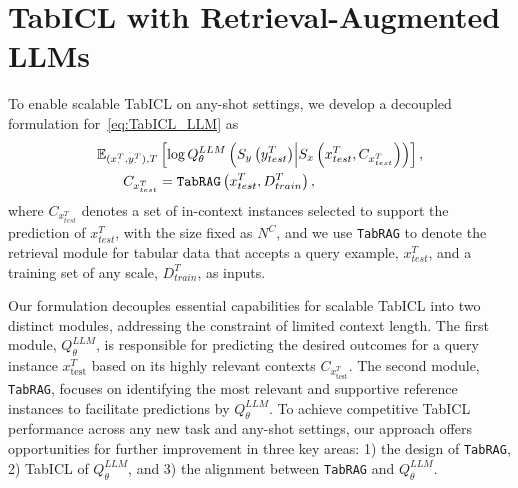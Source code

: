 
\section{TabICL with Retrieval-Augmented LLMs}
\label{sec:method}

To enable scalable TabICL on any-shot settings, we develop a decoupled formulation for~\eqref{eq:TabICL_LLM} as
\begin{align}
\begin{split}
    \mathbb{E}_{(x^T_{\cdot}, y^T_{\cdot}), T}
    &\left[ \log Q^{LLM}_\theta \left( S_{y} \left( y^T_{test} \right) \middle\vert S_{x} \left( x^T_{test}, C_{x^T_{test}} \right) \right) \right], \\
    C_{x^T_{test}} &= \texttt{TabRAG} \left( x^T_{test}, D^T_{train}  \right),
    \label{eq:TabICL_LLM_RAG}
\end{split}
\end{align}
where $C_{x^T_{test}}$ denotes a set of in-context instances selected to support the prediction of $x^T_{test}$, with the size fixed as $N^C$, and we use \texttt{TabRAG} to denote the retrieval module for tabular data that accepts a query example, $x^T_{test}$, and a training set of any scale, $D^T_{train}$, as inputs.

Our formulation decouples essential capabilities for scalable TabICL into two distinct modules, addressing the constraint of limited context length.
The first module, $Q^{LLM}_\theta$, is responsible for predicting the desired outcomes for a query instance $x^T_{\text{test}}$ based on its highly relevant contexts $C_{x^T_{\text{test}}}$.
The second module, \texttt{TabRAG}, focuses on identifying the most relevant and supportive reference instances to facilitate predictions by $Q^{LLM}_\theta$.
To achieve competitive TabICL performance across any new task and any-shot settings, our approach offers opportunities for further improvement in three key areas: 1) the design of \texttt{TabRAG}, 2) TabICL of $Q^{LLM}_\theta$, and 3) the alignment between \texttt{TabRAG} and $Q^{LLM}_\theta$.

